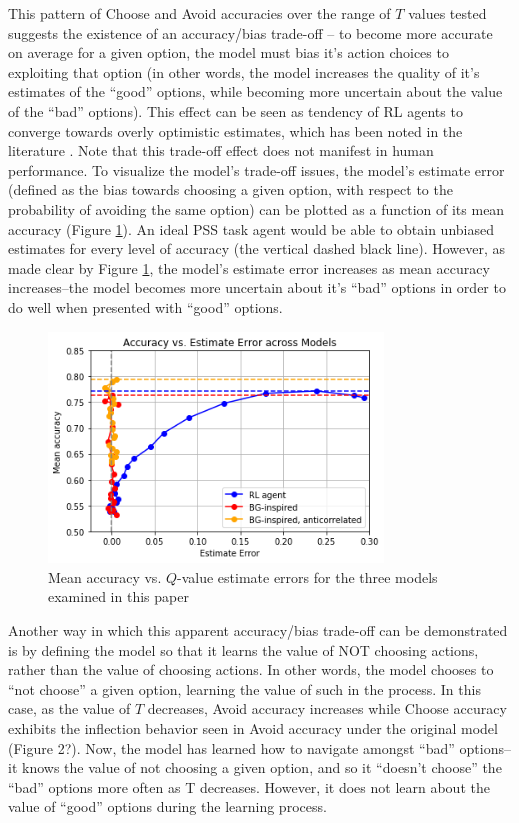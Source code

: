 \documentclass[10pt,letterpaper]{article}
\begin{document}
This pattern of Choose and Avoid accuracies over the range of $T$ values tested suggests the existence of an accuracy/bias trade-off -- to become more accurate on average for a given option, the model must bias it's action choices to exploiting that option (in other words, the model increases the quality of it's estimates of the ``good'' options, while becoming more uncertain about the value of the ``bad'' options). This effect can be seen as tendency of RL agents to converge towards overly optimistic estimates, which has been noted in the literature \cite{hasselt2010double}. Note that this trade-off effect does not manifest in human performance. To visualize the model's trade-off issues, the model's estimate error (defined as the bias towards choosing a given option, with respect to the probability of avoiding the same option) can be plotted as a function of its mean accuracy (Figure \ref{roc}). An ideal PSS task agent would be able to obtain unbiased estimates for every level of accuracy (the vertical dashed black line). However, as made clear by Figure \ref{roc}, the model's estimate error increases as mean accuracy increases--the model becomes more uncertain about it’s ``bad'' options in order to do well when presented with ``good'' options.

\begin{figure}[ht]
	\begin{center}
		\includegraphics[width=3.5in]{roc-agents.png}
	\end{center}
	\caption{Mean accuracy vs. $Q$-value estimate errors for the three models examined in this paper} 
	\label{roc}
\end{figure}

Another way in which this apparent accuracy/bias trade-off can be demonstrated is by defining the model so that it learns the value of NOT choosing actions, rather than the value of choosing actions. In other words, the model chooses to ``not choose'' a given option, learning the value of such in the process. In this case, as the value of $T$ decreases, Avoid accuracy increases while Choose accuracy exhibits the inflection behavior seen in Avoid accuracy under the original model (Figure 2?). Now, the model has learned how to navigate amongst ``bad'' options--it knows the value of not choosing a given option, and so it ``doesn’t choose'' the ``bad'' options more often as T  decreases. However, it does not learn about the value of ``good'' options during the learning process.
\end{document}
